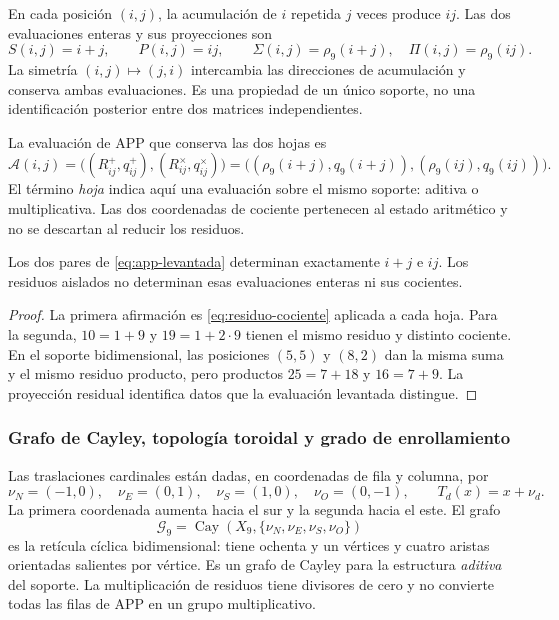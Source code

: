 En cada posición \((i,j)\), la acumulación de \(i\) repetida \(j\) veces produce \(ij\). Las dos evaluaciones enteras y sus proyecciones son
\[
 S(i,j)=i+j,\qquad P(i,j)=ij,\qquad
 \Sigma(i,j)=\rho_9(i+j),\quad \Pi(i,j)=\rho_9(ij).
\]
La simetría \((i,j)\mapsto(j,i)\) intercambia las direcciones de acumulación y conserva ambas evaluaciones. Es una propiedad de un único soporte, no una identificación posterior entre dos matrices independientes.

\begin{definition}
La evaluación de APP que conserva las dos hojas es
\begin{equation}
 \mathcal A(i,j)=
 \bigl((R^+_{ij},q^+_{ij}),(R^\times_{ij},q^\times_{ij})\bigr)
 =\bigl((\rho_9(i+j),q_9(i+j)),(\rho_9(ij),q_9(ij))\bigr).
 \label{eq:app-levantada}
\end{equation}
El término \emph{hoja} indica aquí una evaluación sobre el mismo soporte: aditiva o multiplicativa. Las dos coordenadas de cociente pertenecen al estado aritmético y no se descartan al reducir los residuos.
\end{definition}



\begin{proposition}
Los dos pares de \eqref{eq:app-levantada} determinan exactamente \(i+j\) e \(ij\). Los residuos aislados no determinan esas evaluaciones enteras ni sus cocientes.
\end{proposition}
\begin{proof}
La primera afirmación es \eqref{eq:residuo-cociente} aplicada a cada hoja. Para la segunda, \(10=1+9\) y \(19=1+2\cdot9\) tienen el mismo residuo y distinto cociente. En el soporte bidimensional, las posiciones \((5,5)\) y \((8,2)\) dan la misma suma y el mismo residuo producto, pero productos \(25=7+18\) y \(16=7+9\). La proyección residual identifica datos que la evaluación levantada distingue.
\end{proof}

\subsubsection{Grafo de Cayley, topología toroidal y grado de enrollamiento}

Las traslaciones cardinales están dadas, en coordenadas de fila y columna, por
\[
 \nu_N=(-1,0),\quad\nu_E=(0,1),\quad
 \nu_S=(1,0),\quad\nu_O=(0,-1),\qquad T_d(x)=x+\nu_d.
\]
La primera coordenada aumenta hacia el sur y la segunda hacia el este. El grafo
\[
 \mathscr G_9=\operatorname{Cay}(X_9,\{\nu_N,\nu_E,\nu_S,\nu_O\})
\]
es la retícula cíclica bidimensional: tiene ochenta y un vértices y cuatro aristas orientadas salientes por vértice. Es un grafo de Cayley para la estructura \emph{aditiva} del soporte. La multiplicación de residuos tiene divisores de cero y no convierte todas las filas de APP en un grupo multiplicativo.

